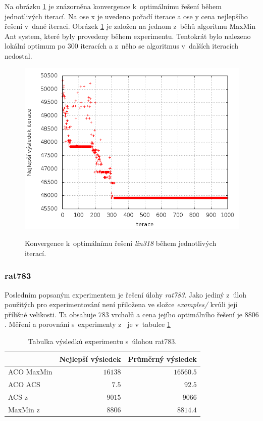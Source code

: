 \documentclass[a4paper, 12pt]{article}
\begin{document}
Na obrázku \ref{fig:best_lin} je znázorněna konvergence k~optimálnímu řešení během jednotlivých iterací. Na ose x je uvedeno pořadí iterace a ose y
cena nejlepšího řešení v~dané iteraci. Obrázek \ref{fig:best_lin} je založen na jednom z~běhů algoritmu MaxMin Ant system, které byly provedeny během experimentu.
Tentokrát bylo nalezeno lokální optimum po 300 iteracích a z~něho se algoritmus v~dalších iteracích nedostal.
\begin{figure}[bt]
\begin{center}
\scalebox{0.6}
{
  \includegraphics{imgs/best_lin.png}
}
\caption{
Konvergence k~optimálnímu řešení \emph{lin318} během jednotlivých iterací.}
\label{fig:best_lin}
\end{center}
\end{figure}

\subsubsection{rat783}
Posledním popsaným experimentem je řešení úlohy \emph{rat783}. Jako jediný z~úloh použitých pro experimentování není přiložena ve složce \emph{examples/}
kvůli její přílišné velikosti.
Ta obsahuje $783$ vrcholů a cena jejího optimálního řešení je $8 806$ \cite{aco:acs}. 
Měření a porovnání s~experimenty z~\cite{aco:maxmintsp,aco:acs} je v~tabulce \ref{rat783}
\begin{table}[tb]
\begin{center}
  \begin{tabular}{ | l | r | r |}
   \hline
    & \textbf{Nejlepší výsledek} & \textbf{Průměrný výsledek} \\ \hline \hline
    ACO MaxMin & $16138$ & $16560.5$ \\ \hline
    ACO ACS & $7.5$ & $92.5$ \\ \hline
    ACS z~\cite{aco:acs} & $9015$ & $9066$ \\ \hline
    MaxMin z~\cite{aco:maxmintsp} & $8806$ & $8814.4$\\ \hline
   \end{tabular}
   \caption{Tabulka výsledků experimentu s~úlohou rat783.}
   \label{rat783}
\end{center}
\end{table}
\end{document}
